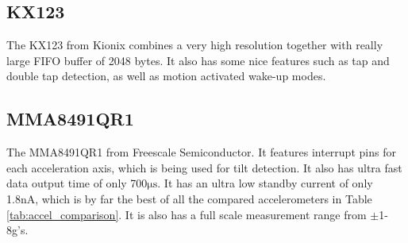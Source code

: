 \subsection{KX123}

The KX123 from Kionix combines a very high resolution together with really large FIFO buffer of 2048 bytes. It also has some nice features such as tap and double tap detection, as well as motion activated wake-up modes.

\subsection{MMA8491QR1}

The MMA8491QR1 from Freescale Semiconductor. It features interrupt pins for each acceleration axis, which is being used for tilt detection. It also has ultra fast data output time of only 700$\si{\micro\second}$. It has an ultra low standby current of only 1.8nA, which is by far the best of all the compared accelerometers in Table \ref{tab:accel_comparison}. It is also has a full scale measurement range from $\pm$1-8g's.